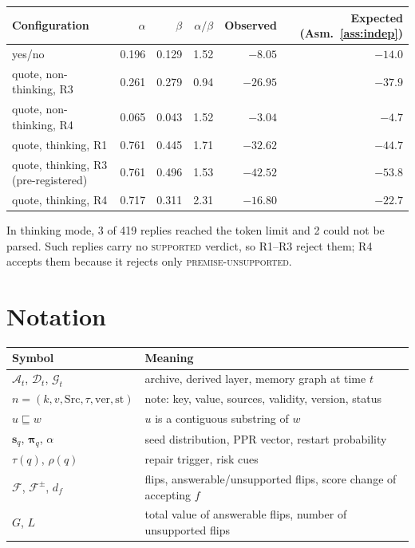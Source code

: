 \documentclass[10pt]{article}
\theoremstyle{plain}
\theoremstyle{definition}
\theoremstyle{remark}
\newcommand{\sub}{\sqsubseteq}
\newcommand{\A}{\mathcal{A}}
\newcommand{\D}{\mathcal{D}}
\newcommand{\G}{\mathcal{G}}
\newcommand{\F}{\mathcal{F}}
\begin{document}
\begin{center}
\small
\begin{tabular}{lrrrrr}
\toprule
Configuration & $\alpha$ & $\beta$ & $\alpha/\beta$ & Observed & Expected (Asm.~\ref{ass:indep}) \\
\midrule
yes/no & 0.196 & 0.129 & 1.52 & $-8.05$ & $-14.0$ \\
quote, non-thinking, R3 & 0.261 & 0.279 & 0.94 & $-26.95$ & $-37.9$ \\
quote, non-thinking, R4 & 0.065 & 0.043 & 1.52 & $-3.04$ & $-4.7$ \\
quote, thinking, R1 & 0.761 & 0.445 & 1.71 & $-32.62$ & $-44.7$ \\
quote, thinking, R3 (pre-registered) & 0.761 & 0.496 & 1.53 & $-42.52$ & $-53.8$ \\
quote, thinking, R4 & 0.717 & 0.311 & 2.31 & $-16.80$ & $-22.7$ \\
\bottomrule
\end{tabular}
\end{center}

In thinking mode, 3 of 419 replies reached the token limit and 2 could not be
parsed. Such replies carry no \textsc{supported} verdict, so R1--R3 reject them;
R4 accepts them because it rejects only \textsc{premise-unsupported}.

\section{Notation}

\begin{tabular}{ll}
\toprule
Symbol & Meaning \\
\midrule
$\A_t$, $\D_t$, $\G_t$ & archive, derived layer, memory graph at time $t$ \\
$n=(k,v,\mathrm{Src},\tau,\mathrm{ver},\mathrm{st})$ & note: key, value, sources, validity, version, status \\
$u\sub w$ & $u$ is a contiguous substring of $w$ \\
$\mathbf{s}_q$, $\boldsymbol{\pi}_q$, $\alpha$ & seed distribution, PPR vector, restart probability \\
$\tau(q)$, $\rho(q)$ & repair trigger, risk cues \\
$\F$, $\F^{\pm}$, $d_f$ & flips, answerable/unsupported flips, score change of accepting $f$ \\
$G$, $L$ & total value of answerable flips, number of unsupported flips \\
\bottomrule
\end{tabular}
\end{document}
